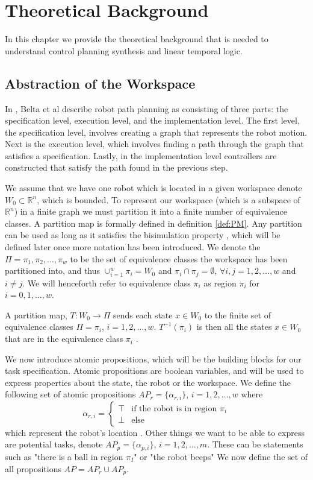 \chapter{Theoretical Background}
In this chapter we provide the theoretical background that is needed to understand control planning synthesis and linear temporal logic. 
\section{Abstraction of the Workspace}
In \cite{belta07}, Belta et al describe robot path planning as consisting of three parts: the specification level, execution level, and the implementation level. The first level, the specification level, involves creating a graph that represents the robot motion. Next is the execution level, which involves finding a path through the graph that satisfies a specification. Lastly, in the implementation level controllers are constructed that satisfy the path found in the previous step. 

We assume that we have one robot which is located in a given workspace denote $W_0 \subset \mathbb{R}^n$, which is bounded. To represent our workspace (which is a subspace of $\mathbb{R}^n$) in a finite graph we must partition it into a finite number of equivalence classes. A partition map is formally defined in definition \ref{def:PM}. Any partition can be used as long as it satisfies the bisimulation property \cite{belta04}, which will be defined later once more notation has been introduced. We denote the $\Pi = {\pi_1, \pi_2, \dots, \pi_w}$ to be the set of equivalence classes the workspace has been partitioned into, and thus $\cup_{i=1}^w \pi_i = W_0$ and $\pi_i \cap \pi_j = \emptyset$, $\forall i,j=1,2,\dots,w$ and $i\neq j$. We will henceforth refer to equivalence class $\pi_i$ as region $\pi_i$ for $i = 0,1,\dots, w$. 

\begin{definition}
\label{def:PM}
A partition map, $T: W_0 \rightarrow \Pi$ sends each state $x \in W_0$ to the finite set of equivalence classes $\Pi = {\pi_i}$,  $i = 1,2,\dots ,w$. $T^{-1}(\pi_i)$ is then all the states $x \in W_0$ that are in the equivalence class $\pi_i$ \cite{fainekos05}. 
\end{definition} 

We now introduce atomic propositions, which will be the building blocks for our task specification. Atomic propositions are boolean variables, and will be used to express properties about the state, the robot or the workspace. We define the following set of atomic propositions $AP_r = \{\alpha_{r,i}\}$, $i=1,2,\dots,w$ where 
\[\alpha_{r,i} =  \begin{cases}
\top & \text{if the robot is in region $\pi_i$} \\
\bot & \text{else}
\end{cases}
\]
which represent the robot's location \cite{guo15}. Other things we want to be able to express are potential tasks, denote $AP_p = \{\alpha_{p,i}\}$, $i=1,2,\dots,m$. These can be statements such as "there is a ball in region $\pi_I$" or "the robot beeps"
We now define the set of all propositions $AP = AP_r \cup AP_p$.

